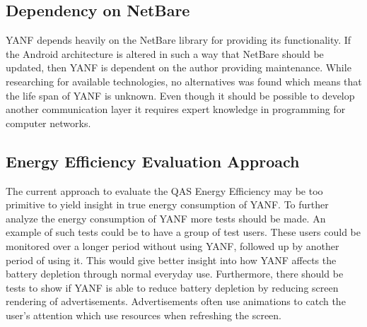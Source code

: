 \documentclass[main.tex]{subfiles}
\begin{document}
\subsection{Dependency on NetBare}
YANF depends heavily on the NetBare library for providing its functionality. If the Android architecture is altered in such a way that NetBare should be updated, then YANF is dependent on the author providing maintenance. While researching for available technologies, no alternatives was found which means that the life span of YANF is unknown. Even though it should be possible to develop another communication layer it requires expert knowledge in programming for computer networks.


\subsection{Energy Efficiency Evaluation Approach}
The current approach to evaluate the QAS Energy Efficiency may be too primitive to yield insight in true energy consumption of YANF. To further analyze the energy consumption of YANF more tests should be made. An example of such tests could be to have a group of test users. These users could be monitored over a longer period without using YANF, followed up by another period of using it. This would give better insight into how YANF affects the battery depletion through normal everyday use. Furthermore, there should be tests to show if YANF is able to reduce battery depletion by reducing screen rendering of advertisements. Advertisements often use animations to catch the user's attention which use resources when refreshing the screen.










\end{document}
